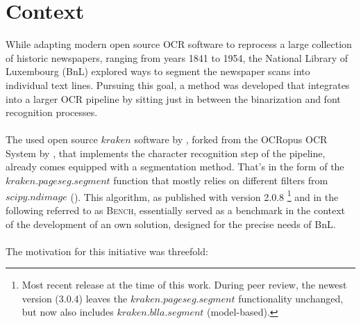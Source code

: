 \documentclass{jdmdh}
\begin{document}
\section{Context}
While adapting modern open source OCR software to reprocess a large collection of historic newspapers, ranging from years 1841 to 1954, the National Library of Luxembourg (BnL) explored ways to segment the newspaper scans into individual text lines. Pursuing this goal, a method was developed that integrates into a larger OCR pipeline by sitting just in between the binarization and font recognition processes. \\ \\
The used open source $kraken$ software by \citet{kraken}, forked from the OCRopus OCR System by \citet{ocropus}, that implements the character recognition step of the pipeline, already comes equipped with a segmentation method. That's in the form of the $kraken.pageseg.segment$ function that mostly relies on different filters from $scipy.ndimage$ (\citet{scipy}). This algorithm, as published with version 2.0.8 \footnote{Most recent release at the time of this work. During peer review, the newest version (3.0.4) leaves the $kraken.pageseg.segment$ functionality unchanged, but now also includes $kraken.blla.segment$ (model-based).} and in the following referred to as \textsc{Bench}, essentially served as a benchmark in the context of the development of an own solution, designed for the precise needs of BnL. \\ \\
The motivation for this initiative was threefold: \\
\end{document}

